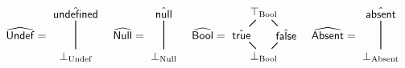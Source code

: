 \[
\abs{Undef} =
\begin{matrix}
  \begin{tikzpicture}
    \node (top) at (0,0) {$\aundef$};
    \node (down) at (0,-1.4) {$\bot_{\mbox{\scriptsize Undef}}$};
    \draw [black, thick, shorten <= -1pt, shorten >=-1pt] (top) -- (down);
  \end{tikzpicture}
\end{matrix}
\quad
\abs{Null} =
\begin{matrix}
  \begin{tikzpicture}
    \node (top) at (0,0) {$\anull$};
    \node (down) at (0,-1.4) {$\bot_{\mbox{\scriptsize Null}}$};
    \draw [black, thick, shorten <= -1pt, shorten >=-1pt] (top) -- (down);
  \end{tikzpicture}
\end{matrix}
\quad
\abs{Bool} =
\begin{matrix}
  \begin{tikzpicture}
    \node (top) at (0,0) {$\top_{\mbox{\scriptsize Bool}}$};
    \node (midleft) at (-0.7,-0.7) {$\atrue$};
    \node (midright) at (0.7,-0.7) {$\afalse$};
    \node (down) at (0,-1.4) {$\bot_{\mbox{\scriptsize Bool}}$};
    \draw [black, thick, shorten <= -1pt, shorten >=-1pt] (top) -- (midleft);
    \draw [black, thick, shorten <= -1pt, shorten >=-1pt] (top) -- (midright);
    \draw [black, thick, shorten <= -1pt, shorten >=-1pt] (midleft) -- (down);
    \draw [black, thick, shorten <= -1pt, shorten >=-1pt] (midright) -- (down);
  \end{tikzpicture}
\end{matrix}
\quad
\abs{Absent} =
\begin{matrix}
  \begin{tikzpicture}
    \node (top) at (0,0) {$\hat{\SF{absent}}$};
    \node (down) at (0,-1.4) {$\bot_{\mbox{\scriptsize Absent}}$};
    \draw [black, thick, shorten <= -1pt, shorten >=-1pt] (top) -- (down);
  \end{tikzpicture}
\end{matrix}
\]
